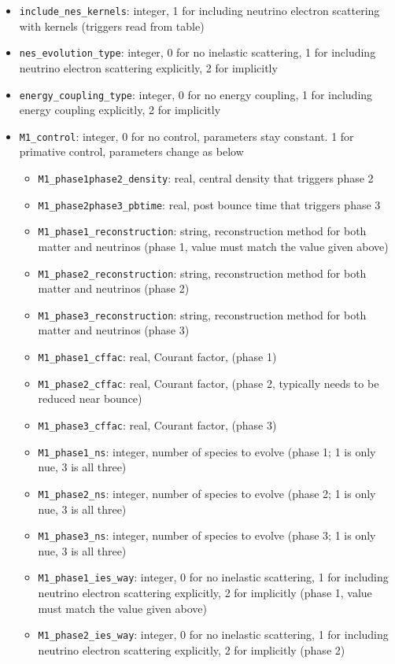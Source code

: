 \documentclass[10pt,nofootinbib]{article}
\begin{document}
\begin{itemize}
\begin{itemize}
\item{{\tt include\_nes\_kernels}: integer, 1 for including neutrino electron scattering with kernels (triggers read from table)}
\item{{\tt nes\_evolution\_type}: integer, 0 for no inelastic scattering, 1 for including neutrino electron scattering explicitly, 2 for implicitly}
\item{{\tt energy\_coupling\_type}: integer, 0 for no energy coupling, 1 for including energy coupling explicitly, 2 for implicitly}
\item{{\tt M1\_control}: integer, 0 for no control, parameters stay constant. 1 for primative control, parameters change as below}
\begin{itemize}
\item{{\tt M1\_phase1phase2\_density}: real, central density that triggers phase 2}
\item{{\tt M1\_phase2phase3\_pbtime}: real, post bounce time that triggers phase 3}
\item{{\tt M1\_phase1\_reconstruction}: string, reconstruction method for both matter and neutrinos (phase 1, value must match the value given above)}
\item{{\tt M1\_phase2\_reconstruction}: string, reconstruction method for both matter and neutrinos (phase 2)}
\item{{\tt M1\_phase3\_reconstruction}: string, reconstruction method for both matter and neutrinos (phase 3)}
\item{{\tt M1\_phase1\_cffac}: real, Courant factor, (phase 1)}
\item{{\tt M1\_phase2\_cffac}: real, Courant factor, (phase 2, typically needs to be reduced near bounce)}
\item{{\tt M1\_phase3\_cffac}: real, Courant factor, (phase 3)}
\item{{\tt M1\_phase1\_ns}: integer, number of species to evolve (phase 1; 1 is only nue, 3 is all three)}
\item{{\tt M1\_phase2\_ns}: integer, number of species to evolve (phase 2; 1 is only nue, 3 is all three)}
\item{{\tt M1\_phase3\_ns}: integer, number of species to evolve (phase 3; 1 is only nue, 3 is all three)}
\item{{\tt M1\_phase1\_ies\_way}: integer, 0 for no inelastic scattering, 1 for including neutrino electron scattering explicitly, 2 for implicitly (phase 1, value must match the value given above)}
\item{{\tt M1\_phase2\_ies\_way}: integer, 0 for no inelastic scattering, 1 for including neutrino electron scattering explicitly, 2 for implicitly (phase 2)}

\end{itemize}
\end{itemize}
\end{itemize}
\end{document}
